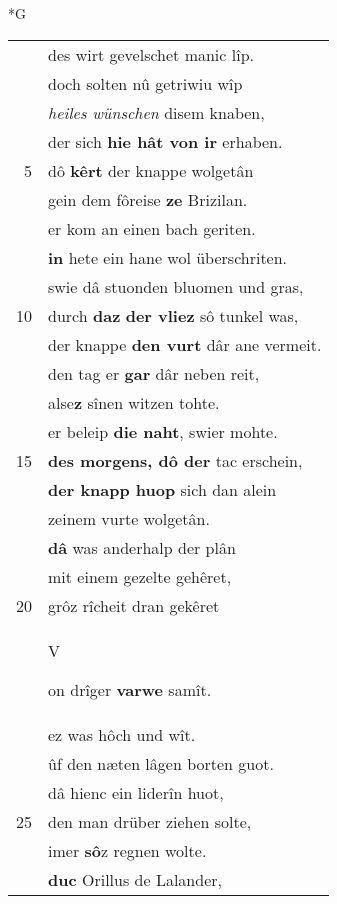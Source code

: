 \documentclass[8pt,a4paper,notitlepage]{article}
\begin{document}
\newpage
\begin{table}[ht]
\begin{minipage}[t]{0.5\linewidth}
\small
\begin{center}*G
\end{center}
\begin{tabular}{rl}
 & des wirt gevelschet manic lîp.\\ 
 & doch solten nû getriwiu wîp\\ 
 & \textit{heiles wünschen} disem knaben,\\ 
 & der sich \textbf{hie hât von ir} erhaben.\\ 
5 & dô \textbf{kêrt} der knappe wolgetân\\ 
 & gein dem fôreise \textbf{ze} Brizilan.\\ 
 & er kom an einen bach geriten.\\ 
 & \textbf{in} hete ein hane wol überschriten.\\ 
 & swie dâ stuonden bluomen und gras,\\ 
10 & durch \textbf{daz} \textbf{der vliez} sô tunkel was,\\ 
 & der knappe \textbf{den vurt} dâr ane vermeit.\\ 
 & den tag er \textbf{gar} dâr neben reit,\\ 
 & alse\textbf{z} sînen witzen tohte.\\ 
 & er beleip \textbf{die naht}, swier mohte.\\ 
15 & \textbf{des morgens, dô der} tac erschein,\\ 
 & \textbf{der knapp huop} sich dan alein\\ 
 & zeinem vurte wolgetân.\\ 
 & \textbf{dâ} was anderhalp der plân\\ 
 & mit einem gezelte gehêret,\\ 
20 & grôz rîcheit dran gekêret\\ 
 & \begin{large}V\end{large}on drîger \textbf{varwe} samît.\\ 
 & ez was hôch und wît.\\ 
 & ûf den næten lâgen borten guot.\\ 
 & dâ hienc ein liderîn huot,\\ 
25 & den man drüber ziehen solte,\\ 
 & imer \textbf{sô}z regnen wolte.\\ 
 & \textbf{duc} Orillus de Lalander,\\ 

\end{tabular}
\end{minipage}
\end{table}
\end{document}
